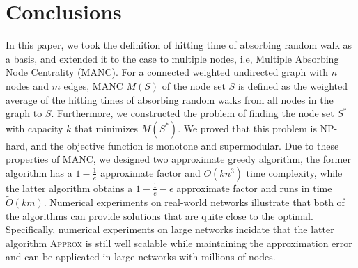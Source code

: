 \documentclass[sigconf]{acmart}
\begin{document}
\section{Conclusions}

In this paper, we took the definition of hitting time of absorbing random walk as a basis, and extended it to the case to multiple nodes, i.e, Multiple Absorbing Node Centrality (MANC).
For a connected weighted undirected graph with \(n\) nodes and \(m\) edges, MANC \(M(S)\) of the node set \(S\) is defined as the weighted average of the hitting times of absorbing random walks from all nodes in the graph to \(S\).
Furthermore, we constructed the problem of finding the node set \(S^*\) with capacity \(k\) that minimizes \(M(S^*)\).
We proved that this problem is NP-hard, and the objective function is monotone and supermodular.
Due to these properties of MANC, we designed two approximate greedy algorithm, the former algorithm has a \(1-\frac1e\) approximate factor and \(O(kn^3)\) time complexity, while the latter algorithm obtains a \(1-\frac1e-\epsilon\) approximate factor and runs in time \(\tilde{O}(km)\).
Numerical experiments on real-world networks illustrate that both of the algorithms can provide solutions that are quite close to the optimal.
Specifically, numerical experiments on large networks incidate that the latter algorithm \textsc{Approx} is still well scalable while maintaining the approximation error and can be applicated in large networks with millions of nodes.


\balance

\end{document}
